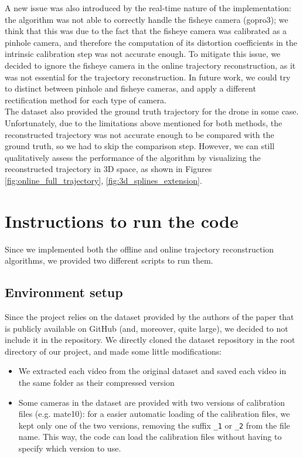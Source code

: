 \documentclass[11pt]{article}
\begin{document}
A new issue was also introduced by the real-time nature of the implementation: the algorithm was not able to correctly handle the fisheye camera (gopro3); we think that this was due to the fact that the fisheye camera was calibrated as a pinhole camera, and therefore the computation of its distortion coefficients in the intrinsic calibration step was not accurate enough. To mitigate this issue, we decided to ignore the fisheye camera in the online trajectory reconstruction, as it was not essential for the trajectory reconstruction. In future work, we could try to distinct between pinhole and fisheye cameras, and apply a different rectification method for each type of camera.\\

The dataset also provided the ground truth trajectory for the drone in some case. Unfortunately, due to the limitations above mentioned for both methods, the reconstructed trajectory was not accurate enough to be compared with the ground truth, so we had to skip the comparison step. However, we can still qualitatively assess the performance of the algorithm by visualizing the reconstructed trajectory in 3D space, as shown in Figures \ref{fig:online_full_trajectory}, \ref{fig:3d_splines_extension}.

\section{Instructions to run the code}

Since we implemented both the offline and online trajectory reconstruction algorithms, we provided two different scripts to run them.

\subsection{Environment setup}

Since the project relies on the dataset provided by the authors of the paper that is publicly available on GitHub (and, moreover, quite large), we decided to not include it in the repository. We directly cloned the dataset repository in the root directory of our project, and made some little modifications:

\begin{itemize}
    \item We extracted each video from the original dataset and saved each video in the same folder as their compressed version
    \item Some cameras in the dataset are provided with two versions of calibration files (e.g. mate10): for a easier automatic loading of the calibration files, we kept only one of the two versions, removing the suffix \texttt{\_1} or \texttt{\_2} from the file name. This way, the code can load the calibration files without having to specify which version to use.
\end{itemize}
\end{document}
